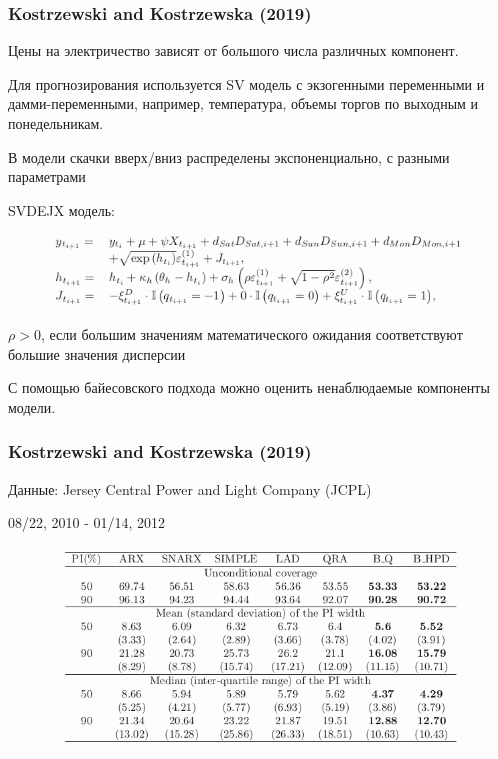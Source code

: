 \documentclass[c, dvipsnames]{beamer}  %
\begin{document}
\begin{frame}[shrink=5]
\frametitle{Kostrzewski and Kostrzewska (2019)} 

Цены на электричество зависят от большого числа различных компонент.

Для прогнозирования используется SV модель с экзогенными переменными и дамми-переменными, например, температура, объемы торгов по выходным и понедельникам.

В модели скачки вверх/вниз распределены экспоненциально, с разными параметрами

SVDEJX модель: 

\begin{figure}
	\centering
	\includegraphics[width=0.7\linewidth]{screenshot005}
	\caption{}
	\label{fig:screenshot005}
\end{figure}

$\rho > 0$, если большим значениям математического ожидания соответствуют большие значения дисперсии 

С помощью байесовского подхода можно оценить ненаблюдаемые компоненты модели.

\end{frame}



\begin{frame}[shrink=5]
\frametitle{Kostrzewski and Kostrzewska (2019)} 

Данные:  Jersey Central Power and Light Company (JCPL)

08/22, 2010 -  01/14, 2012

\begin{figure}
	\centering
	\includegraphics[width=0.7\linewidth]{screenshot006}
	\caption{}
	\label{fig:screenshot006}
\end{figure}



\end{frame}
\end{document}
